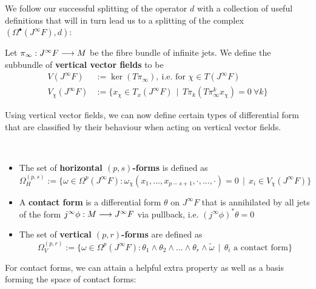 We follow our successful splitting of the operator $d$ with a collection of useful definitions that will in turn lead us to a splitting of the complex $(\Omega^\bullet(J^\infty F), d)$:

\begin{definition}
Let $\pi_\infty: J^\infty F \longrightarrow M$ be the fibre bundle of infinite jets. We define the subbundle of \textbf{vertical vector fields} to be
\begin{align*}
  V(J^\infty F) &:= \ker (T\pi_\infty), \ \text{i.e. for } \chi\in T(J^\infty F)\\
  V_\chi(J^\infty F) &:= \{ x_\chi \in T_x(J^\infty F) \ \ | \ \ T\pi_k(T\pi_\infty^k x_\chi) = 0 \ \forall k \}
\end{align*}
\end{definition}

Using vertical vector fields, we can now define certain types of differential form that are classified by their behaviour when acting on vertical vector fields.

\begin{definition}~
\begin{itemize}
  \item The set of \textbf{horizontal $(p,s)$-forms} is defined as
  $$ \Omega^{(p,s)}_H := \{ \omega \in \Omega^p(J^\infty F) : \omega_\chi (x_1, ..., x_{p-s+1}, \cdot, ..., \cdot) = 0 \ \ |\ \  x_i \in V_\chi(J^\infty F) \} $$

  \item A \textbf{contact form} is a differential form $\theta$ on $J^\infty F$ that is annihilated by all jets of the form $j^\infty \phi : M \lra J^\infty F$ via pullback, i.e. $(j^\infty \phi)^* \theta = 0$

  \item The set of \textbf{vertical $(p,r)$-forms} are defined as
  $$ \Omega^{(p,r)}_V := \{ \omega \in \Omega^p(J^\infty F) : \theta_1 \wedge \theta_2 \wedge ... \wedge \theta_r \wedge \widetilde \omega \ \ |\ \  \theta_i \text{ a  contact form} \} $$
\end{itemize}
\end{definition}

For contact forms, we can attain a helpful extra property as well as a basis forming the space of contact forms:

